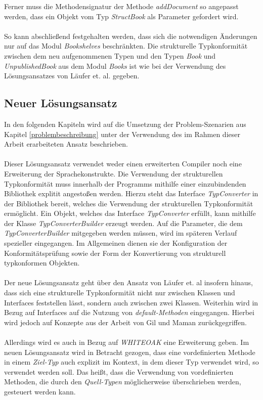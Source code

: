 \documentclass[11pt, 
ngerman,
doublespacing,
chapterinoneline, %
consistentlayout, %
]{scrartcl}
\begin{document}
Ferner muss die Methodensignatur der Methode \emph{addDocument} so angepasst werden, dass ein Objekt vom Typ \emph{StructBook} als Parameter gefordert wird.\\\\
So kann abschließend festgehalten werden, dass sich die notwendigen Änderungen nur auf das Modul \emph{Bookshelves} beschränkten. Die strukturelle Typkonformität zwischen dem neu aufgenommenen Typen und den Typen \emph{Book} und \emph{UnpublishedBook}
aus dem Modul \emph{Books} ist wie bei der Verwendung des Lösungsansatzes von Läufer et. al. \cite{structconfjava} gegeben.
\subsection{Neuer Lösungsansatz}
In den folgenden Kapiteln wird auf die Umsetzung der Problem-Szenarien aus Kapitel \ref{problembeschreibung} unter der Verwendung des im Rahmen dieser Arbeit erarbeiteten Ansatz beschrieben.\\\\
Dieser Lösungsansatz verwendet weder einen erweiterten Compiler noch eine Erweiterung der Sprachekonstrukte. Die Verwendung der strukturellen Typkonformität muss inner\-halb der Programms mithilfe einer einzubindenden Bibliothek explitit angestoßen werden. Hierzu steht das Interface \emph{TypConverter} in der Bibliothek  bereit, welches die Verwendung der strukturellen Typkonformität ermöglicht. Ein Objekt, welches das Interface \linebreak\emph{TypConverter}  erfüllt, kann mithilfe der Klasse \emph{TypConverterBuilder} erzeugt werden. Auf die Parameter, die dem \emph{TypConverterBuilder} mitgegeben werden müssen, wird im späteren Verlauf spezieller eingegangen. Im Allgemeinen dienen sie der Konfiguration der Konformitätsprüfung sowie der Form der Konvertierung von strukturell typkonformen Objekten.\\\\
Der neue Lösungsansatz geht über den Ansatz von Läufer et. al \cite{structconfjava} insofern hinaus, dass sich eine strukturelle Typkonformität nicht nur zwischen Klassen und Interfaces feststellen lässt, sondern auch zwischen zwei Klassen. Weiterhin wird in Bezug auf Interfaces auf die Nutzung von \emph{default-Methoden} eingegangen. Hierbei wird jedoch auf Konzepte aus der Arbeit von Gil und Maman \cite{whiteoak} zurückgegriffen.\\\\
Allerdings wird es auch in Bezug auf \emph{WHITEOAK} eine Erweiterung geben. Im neuen Lösungsan\-satz wird in Betracht gezogen, dass eine vordefinierten Methode in einem \emph{Ziel-Typ} auch explizit im Kontext, in dem dieser Typ verwendet wird, so verwendet werden soll. Das heißt, dass die Verwendung von vordefinierten Methoden, die durch den \emph{Quell-Typen} möglicherweise überschrieben werden, gesteuert werden kann.
\end{document}
